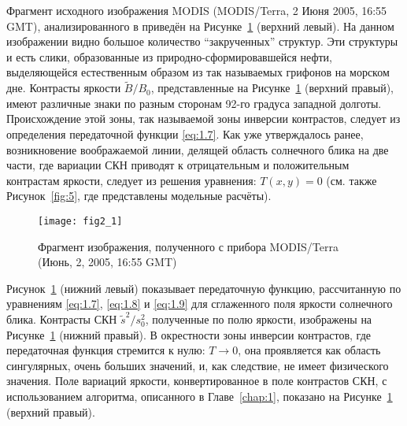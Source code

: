Фрагмент исходного изображения MODIS (MODIS/Terra, 2 Июня 2005, 16:55 GMT), анализированного в \citep{Hu2009} приведён на Рисунке~\ref{fig:2.1} (верхний левый). На данном изображении видно большое количество ``закрученных'' структур. Эти структуры и есть слики, образованные из природно-сформировавшейся нефти, выделяющейся естественным образом из так называемых грифонов на морском дне. Контрасты яркости $\tilde{B}/B_{0} $, представленные на Рисунке~\ref{fig:2.1} (верхний правый), имеют различные знаки по разным сторонам 92-го градуса западной долготы. Происхождение этой зоны, так называемой зоны инверсии контрастов, следует из определения передаточной функции \eqref{eq:1.7}. Как уже утверждалось ранее, возникновение воображаемой линии, делящей область солнечного блика на две части, где вариации СКН приводят к отрицательным и положительным контрастам яркости, следует из решения уравнения: $T(x,y)=0$ (см. также Рисунок~\ref{fig:5}, где представлены модельные расчёты).



\begin{figure}[!thb]
 \texttt{[image: fig2\_1]}
 \caption{Фрагмент изображения, полученного с прибора MODIS/Terra (Июнь, 2, 2005, 16:55 GMT)}
 \label{fig:2.1}
\end{figure}


Рисунок~\ref{fig:2.1} (нижний левый) показывает передаточную функцию, рассчитанную по уравнениям \eqref{eq:1.7}, \eqref{eq:1.8} и \eqref{eq:1.9} для сглаженного поля яркости солнечного блика. Контрасты СКН $\tilde{s}^{2} /s_{0}^{2} $, полученные по полю яркости, изображены на Рисунке~\ref{fig:2.1} (нижний правый). В окрестности зоны инверсии контрастов, где передаточная функция стремится к нулю: $T\to 0$, она проявляется как область сингулярных, очень больших значений, и, как следствие, не имеет физического значения. Поле вариаций яркости, конвертированное в поле контрастов СКН, с использованием алгоритма, описанного в Главе~\ref{chap:1}, показано на Рисунке~\ref{fig:2.1} (верхний правый).

